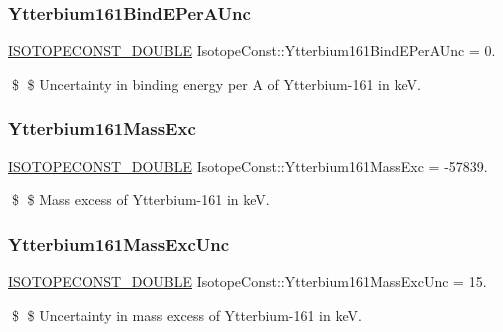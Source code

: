 \subsubsection{\texorpdfstring{Ytterbium161\+Bind\+E\+Per\+A\+Unc}{Ytterbium161BindEPerAUnc}}
{\footnotesize\ttfamily \mbox{\hyperlink{group___isotope_const-_macros_ga8f45a7272ce02c0b4c65c44636ed719a}{I\+S\+O\+T\+O\+P\+E\+C\+O\+N\+S\+T\+\_\+\+D\+O\+U\+B\+LE}} Isotope\+Const\+::\+Ytterbium161\+Bind\+E\+Per\+A\+Unc = 0.}

\$ \$ Uncertainty in binding energy per A of Ytterbium-\/161 in keV. \mbox{\label{group___isotope_const-_ytterbium-_yb161_gaa54bfe20358f9752c9a9e43afd0193d8}} 
\subsubsection{\texorpdfstring{Ytterbium161\+Mass\+Exc}{Ytterbium161MassExc}}
{\footnotesize\ttfamily \mbox{\hyperlink{group___isotope_const-_macros_ga8f45a7272ce02c0b4c65c44636ed719a}{I\+S\+O\+T\+O\+P\+E\+C\+O\+N\+S\+T\+\_\+\+D\+O\+U\+B\+LE}} Isotope\+Const\+::\+Ytterbium161\+Mass\+Exc = -\/57839.}

\$ \$ Mass excess of Ytterbium-\/161 in keV. \mbox{\label{group___isotope_const-_ytterbium-_yb161_ga71b89ea7945b68300d855b034d17dc0b}} 
\subsubsection{\texorpdfstring{Ytterbium161\+Mass\+Exc\+Unc}{Ytterbium161MassExcUnc}}
{\footnotesize\ttfamily \mbox{\hyperlink{group___isotope_const-_macros_ga8f45a7272ce02c0b4c65c44636ed719a}{I\+S\+O\+T\+O\+P\+E\+C\+O\+N\+S\+T\+\_\+\+D\+O\+U\+B\+LE}} Isotope\+Const\+::\+Ytterbium161\+Mass\+Exc\+Unc = 15.}

\$ \$ Uncertainty in mass excess of Ytterbium-\/161 in keV. \mbox{\label{group___isotope_const-_ytterbium-_yb161_gae3ad949c267926447c1a77df7d1094d1}} 
